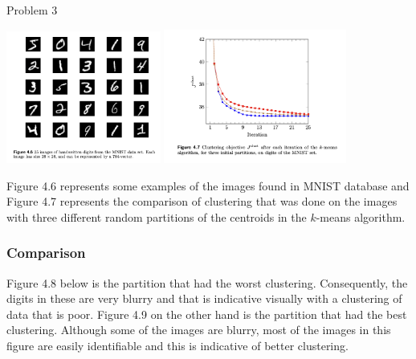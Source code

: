 \begin{problem}{Problem 3}
\begin{highlight}[Solution]
        \begin{center}
            \includegraphics[width = 0.38\textwidth]{./Images/Figure 4.6.png}
            \hspace*{20pt}
            \includegraphics[width = 0.45\textwidth]{./Images/Figure 4.7.png}
        \end{center}
        Figure 4.6 represents some examples of the images found in MNIST database and Figure 4.7 represents the comparison of clustering that was done on the images with three different random partitions
        of the centroids in the $k$-means algorithm. \vspace*{1em}

        \subsubsection*{Comparison}

        Figure 4.8 below is the partition that had the worst clustering. Consequently, the digits in these are very blurry and that is indicative visually with a clustering of data that is poor. Figure 
        4.9 on the other hand is the partition that had the best clustering. Although some of the images are blurry, most of the images in this figure are easily identifiable and this is indicative of 
        better clustering. \vspace*{1em}
        

\end{highlight}
\end{problem}
